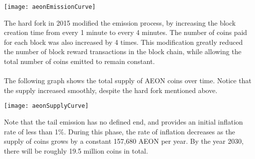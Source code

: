 \begin{center}
	\texttt{[image: aeonEmissionCurve]}
\end{center}
The hard fork in 2015 modified the emission process, by increasing the block creation time from every 1 minute to every 4 minutes. The number of coins paid for each block was also increased by 4 times. This modification greatly reduced the number of block reward transactions in the block chain, while allowing the total number of coins emitted to remain constant.\\
\\
The following graph shows the total supply of AEON coins over time. Notice that the supply increased smoothly, despite the hard fork mentioned above.

\begin{center}
	\texttt{[image: aeonSupplyCurve]}
\end{center}
Note that the tail emission has no defined end, and provides an initial inflation rate of less than 1\%. During this phase, the rate of inflation decreases as the supply of coins grows by a constant 157,680 AEON per year. By the year 2030, there will be roughly 19.5 million coins in total.

